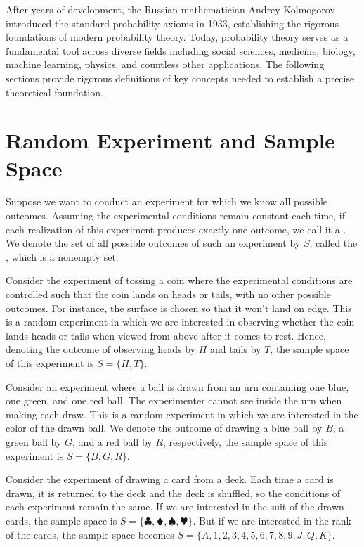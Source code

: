 After years of development, the Russian mathematician Andrey Kolmogorov introduced the standard probability axioms in 1933, establishing the rigorous foundations of modern probability theory.
Today, probability theory serves as a fundamental tool across diverse fields including social sciences, medicine, biology, machine learning, physics, and countless other applications.
The following sections provide rigorous definitions of key concepts needed to establish a precise theoretical foundation.

\section{Random Experiment and Sample Space}

Suppose we want to conduct an experiment for which we know all possible outcomes.
Assuming the experimental conditions remain constant each time, if each realization of this experiment produces exactly one outcome, we call it a .
We denote the set of all possible outcomes of such an experiment by \( S \), called the , which is a nonempty set.
\begin{exmp}\label{exmp:coin_toss}
	Consider the experiment of tossing a coin where the experimental conditions are controlled such that the coin lands on heads or tails, with no other possible outcomes.
	For instance, the surface is chosen so that it won't land on edge.
	This is a random experiment in which we are interested in observing whether the coin lands heads or tails when viewed from above after it comes to rest.
	Hence, denoting the outcome of observing heads by \( H \) and tails by \( T \), the sample space of this experiment is \( S = \{ H, T \} \).
\end{exmp}
\begin{exmp}\label{exmp:three_balls_urn}
	Consider an experiment where a ball is drawn from an urn containing one blue, one green, and one red ball.
	The experimenter cannot see inside the urn when making each draw.
	This is a random experiment in which we are interested in the color of the drawn ball.
	We denote the outcome of drawing a blue ball by \( B \), a green ball by \( G \), and a red ball by \( R \), respectively, the sample space of this experiment is \( S = \{ B, G, R \} \).
\end{exmp}
\begin{exmp}\label{exmp:playing_cards}
	Consider the experiment of drawing a card from a deck.
	Each time a card is drawn, it is returned to the deck and the deck is shuffled, so the conditions of each experiment remain the same.
	If we are interested in the suit of the drawn cards, the sample space is \( S = \{ \clubsuit, \vardiamondsuit, \spadesuit, \varheartsuit \} \).
	But if we are interested in the rank of the cards, the sample space becomes \( S = \{ A, 1, 2, 3, 4, 5, 6, 7, 8, 9, J, Q, K \} \).
\end{exmp}

